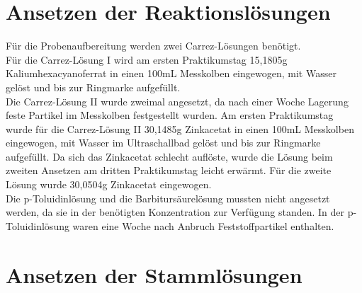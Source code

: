 \section{Ansetzen der Reaktionslösungen}

Für die Probenaufbereitung werden zwei Carrez-Lösungen benötigt.\\ 
Für die Carrez-Lösung I wird am ersten Praktikumstag 15,1805g Kaliumhexacyanoferrat in einen 100mL Messkolben eingewogen, mit Wasser gelöst und bis zur Ringmarke aufgefüllt.\\ 
Die Carrez-Lösung II wurde zweimal angesetzt, da nach einer Woche Lagerung feste Partikel im Messkolben festgestellt wurden. Am ersten Praktikumstag wurde für die Carrez-Lösung II 30,1485g Zinkacetat in einen 100mL Messkolben eingewogen, mit Wasser im Ultraschallbad gelöst und bis zur Ringmarke aufgefüllt. Da sich das Zinkacetat schlecht auflöste, wurde die Lösung beim zweiten Ansetzen am dritten Praktikumstag leicht erwärmt. Für die zweite Lösung wurde 30,0504g Zinkacetat eingewogen.\\ 
Die p-Toluidinlösung und die Barbitursäurelösung mussten nicht angesetzt werden, da sie in der benötigten Konzentration zur Verfügung standen. In der p-Toluidinlösung waren eine Woche nach Anbruch Feststoffpartikel enthalten.

\section{Ansetzen der Stammlösungen}


